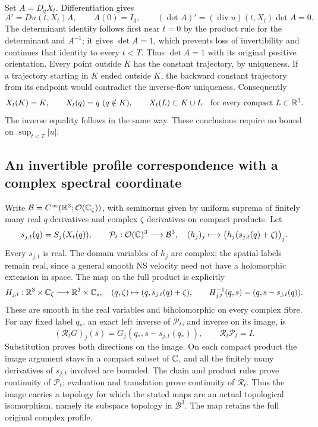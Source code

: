 Set $A=D_qX_t$. Differentiation gives
\[
 A'=Du(t,X_t)A,\qquad A(0)=I_3,\qquad
 (\det A)'=(\operatorname{div}u)(t,X_t)\det A=0.
\]
The determinant identity follows first near $t=0$ by the product rule
for the determinant and $A^{-1}$; it gives $\det A=1$, which prevents
loss of invertibility and continues that identity to every $t<T$.
Thus $\det A=1$ with its original positive orientation. Every point
outside $K$ has the constant trajectory, by uniqueness. If a trajectory
starting in $K$ ended outside $K$, the backward constant trajectory
from its endpoint would contradict the inverse-flow uniqueness.
Consequently
\begin{equation}
 X_t(K)=K,\qquad X_t(q)=q\ (q\notin K),\qquad
 X_t(L)\subset K\cup L\quad\hbox{for every compact }L\subset\mathbb R^3.
 \label{naf:compact}
\end{equation}
The inverse equality follows in the same way. These conclusions require
no bound on $\sup_{t<T}|u|$.

\subsection{An invertible profile correspondence with a complex spectral coordinate}

Write $\mathcal B=C^\infty(\mathbb R^3;\mathcal O(\mathbb C_\zeta))$, with seminorms
given by uniform suprema of finitely many real $q$ derivatives and
complex $\zeta$ derivatives on compact products. Let
\[
 s_{j,t}(q)=S_j(X_t(q)),\qquad
 \mathcal P_t:\mathcal O(\mathbb C)^3\longrightarrow\mathcal B^3,
 \quad (h_j)_j\longmapsto
       \bigl(h_j(s_{j,t}(q)+\zeta)\bigr)_j.
\]
Every $s_{j,t}$ is real. The domain variables of $h_j$ are complex;
the spatial labels remain real, since a general smooth NS velocity
need not have a holomorphic extension in space. The map on the full
product is explicitly
\begin{equation}
 H_{j,t}:\mathbb R^3\times\mathbb C_\zeta\longrightarrow\mathbb R^3\times\mathbb C_s,
 \quad(q,\zeta)\mapsto(q,s_{j,t}(q)+\zeta),\qquad
 H_{j,t}^{-1}(q,s)=(q,s-s_{j,t}(q)).
 \label{naf:skew}
\end{equation}
These are smooth in the real variables and biholomorphic on every
complex fibre. For any fixed label $q_*$, an exact left inverse of
$\mathcal P_t$, and inverse on its image, is
\begin{equation}
 (\mathcal R_tG)_j(s)=G_j(q_*,s-s_{j,t}(q_*)),\qquad
 \mathcal R_t\mathcal P_t=I.
 \label{naf:leftinverse}
\end{equation}
Substitution proves both directions on the image. On each compact
product the image argument stays in a compact subset of $\mathbb C$, and all
the finitely many derivatives of $s_{j,t}$ involved are bounded.
The chain and product rules prove continuity of $\mathcal P_t$;
evaluation and translation prove continuity of $\mathcal R_t$.
Thus the image carries a topology for which the stated maps are an
actual topological isomorphism, namely its subspace topology in
$\mathcal B^3$. The map retains the full original complex profile.

